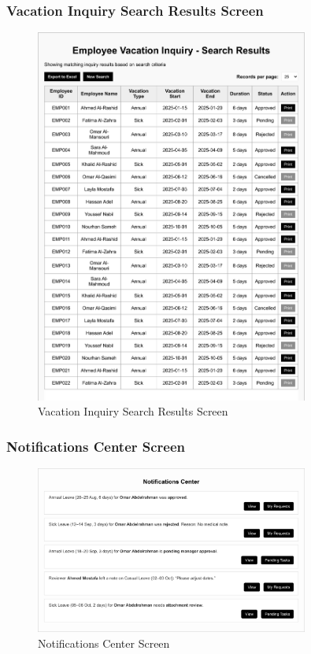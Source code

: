 \documentclass[12pt,a4paper]{article}
\begin{document}
\subsubsection{Vacation Inquiry Search Results Screen}
\begin{figure}[H]
\centering
\includegraphics[width=0.8\textwidth]{Wireframes/Employee-Vacation-Inquiry-Search-Results/Employee-Vacation-Inquiry-Search-Results-1.png}
\caption{Vacation Inquiry Search Results Screen}
\label{fig:inquiry-search-results-screen}
\end{figure}

\subsubsection{Notifications Center Screen}
\begin{figure}[H]
\centering
\includegraphics[width=0.8\textwidth]{Wireframes/Notifications-Center/Notifications-Center-1.png}
\caption{Notifications Center Screen}
\label{fig:notifications-center-screen}
\end{figure}
\end{document}
